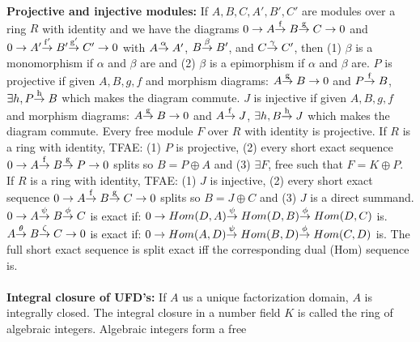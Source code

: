 {\bf Projective and injective modules:}
If $A, B, C, A', B', C'$ are modules 
over a ring $R$ with identity and we have the diagrams
$0 \rightarrow A
{\buildrel\rm f\over \rightarrow} \; B {\buildrel\rm g\over \rightarrow} \; 
C \rightarrow 0$
and
$0 \rightarrow A'
{\buildrel\rm f'\over \rightarrow} \; B' {\buildrel\rm g'\over \rightarrow} \; 
C' \rightarrow 0$ with 
$A
{\buildrel\rm \alpha\over \rightarrow} \; 
A'$,
$B
{\buildrel\rm \beta\over \rightarrow} \; 
B'$, and
$C
{\buildrel\rm \gamma\over \rightarrow} \; 
C'$, then (1) $\beta$ is a monomorphism if $\alpha$ and $\beta$ are and (2)
$\beta$ is a epimorphism if $\alpha$ and $\beta$ are.
$P$ is projective if given $A, B, g, f$ and morphism diagrams:
$A {\buildrel\rm g\over \rightarrow} \; B \rightarrow 0$ and
$P {\buildrel\rm f\over \rightarrow} \; B$, $\exists h,
P {\buildrel\rm h\over \rightarrow} \; B$ which makes the diagram commute.
$J$ is injective if given $A, B, g, f$ and morphism diagrams:
$A {\buildrel\rm g\over \rightarrow} \; B \rightarrow 0$ and
$A {\buildrel\rm f\over \rightarrow} \; J$, $\exists h,
B {\buildrel\rm h\over \rightarrow} \; J$ which makes the diagram commute.
Every free module $F$ over $R$ with identity is projective.  
If $R$ is a ring
with identity, TFAE: (1) $P$ is projective, (2) every short exact sequence
$0 \rightarrow A
{\buildrel\rm f\over \rightarrow} \; B {\buildrel\rm g\over \rightarrow} \; 
P \rightarrow 0$ splits so $B= P \oplus A$ and (3) $\exists F$, free such that
$F=K \oplus P$.
If $R$ is a ring
with identity, TFAE: (1) $J$ is injective, (2) every short exact sequence
$0 \rightarrow A
{\buildrel\rm f\over \rightarrow} \; B {\buildrel\rm g\over \rightarrow} \; 
C \rightarrow 0$ splits so $B= J \oplus C$ and (3) $J$ is a direct summand.
$0 \rightarrow A
{\buildrel\rm \psi\over \rightarrow} \; B {\buildrel\rm \phi\over \rightarrow} \; 
C$ is exact if:
$0 \rightarrow Hom(D, A)
{\buildrel\rm \psi\over \rightarrow} \; Hom(D, B) {\buildrel\rm \phi\over \rightarrow} \; 
Hom(D, C)$ is.
$A
{\buildrel\rm \theta\over \rightarrow} \; B {\buildrel\rm \zeta\over \rightarrow} \; 
C \rightarrow 0$ 
is exact if:
$0 \rightarrow Hom(A, D)
{\buildrel\rm \psi\over \rightarrow} \; Hom(B, D) {\buildrel\rm \phi\over \rightarrow} \; 
Hom(C, D)$ is.  The full short exact sequence is split exact iff the corresponding
dual (Hom) sequence is.
\\
\\
{\bf Integral closure of  UFD's:} 
If $A$ us a unique factorization domain, $A$ is integrally closed.  
The integral closure in a number field
$K$ is called the ring of algebraic integers.  Algebraic integers form a free
